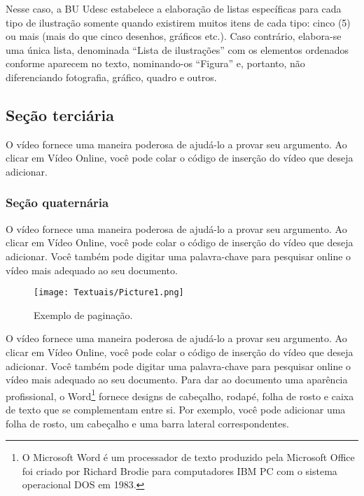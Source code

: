 Nesse caso, a BU Udesc estabelece a elaboração de listas específicas para cada tipo de ilustração somente quando existirem muitos itens de cada tipo: cinco (5) ou mais (mais do que cinco desenhos, gráficos etc.). Caso contrário, elabora-se uma única lista, denominada “Lista de ilustrações” com os elementos ordenados conforme aparecem no texto, nominando-os “Figura” e, portanto, não diferenciando fotografia, gráfico, quadro e outros.


\subsection{Seção terciária}

O vídeo fornece uma maneira poderosa de ajudá-lo a provar seu argumento. Ao clicar em Vídeo Online, você pode colar o código de inserção do vídeo que deseja adicionar.

\subsubsection{Seção quaternária}

O vídeo fornece uma maneira poderosa de ajudá-lo a provar seu argumento. Ao clicar em Vídeo Online, você pode colar o código de inserção do vídeo que deseja adicionar. Você também pode digitar uma palavra-chave para pesquisar online o vídeo mais adequado ao seu documento. 


\begin{figure}
	\centering
	\caption{Exemplo de paginação.}
	\texttt{[image: Textuais/Picture1.png]}
\end{figure}





O vídeo fornece uma maneira poderosa de ajudá-lo a provar seu argumento. Ao clicar em Vídeo Online, você pode colar o código de inserção do vídeo que deseja adicionar. Você também pode digitar uma palavra-chave para pesquisar online o vídeo mais adequado ao seu documento. Para dar ao documento uma aparência profissional, o Word\footnote{O Microsoft Word é um processador de texto produzido pela Microsoft Office foi criado por Richard Brodie para computadores IBM PC com o sistema operacional DOS em 1983.} fornece designs de cabeçalho, rodapé, folha de rosto e caixa de texto que se complementam entre si. Por exemplo, você pode adicionar uma folha de rosto, um cabeçalho e uma barra lateral correspondentes.

